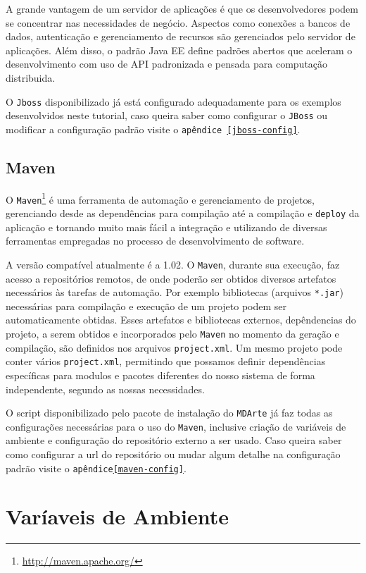 A grande vantagem de um servidor de aplicações é que os desenvolvedores podem se
concentrar nas necessidades de negócio. Aspectos como conexões a bancos de
dados, autenticação e gerenciamento de recursos são gerenciados pelo servidor de
aplicações. Além disso, o padrão Java EE define padrões abertos que aceleram o
desenvolvimento com uso de API padronizada e pensada para computação
distribuida.

O \texttt{Jboss} disponibilizado já está configurado adequadamente para os
exemplos desenvolvidos neste tutorial, caso queira saber como configurar o
\texttt{JBoss} ou modificar a configuração padrão visite o \texttt{apêndice
\ref{jboss-config}}.

\subsection{Maven}
O
\texttt{Maven}\footnote{\href{http://maven.apache.org/}{http://maven.apache.org/}}
é uma ferramenta de automação e gerenciamento de projetos, gerenciando desde as
dependências para compilação até a compilação e \texttt{deploy} da aplicação e
tornando muito mais fácil a integração e utilizando de diversas ferramentas
empregadas no processo de desenvolvimento de software.

A versão compatível atualmente é a 1.02. O \texttt{Maven}, durante sua execução,
faz acesso a repositórios remotos, de onde poderão ser obtidos diversos artefatos
necessários às tarefas de automação. Por exemplo bibliotecas (arquivos
\texttt{*.jar}) necessárias para compilação e execução de um projeto podem ser
automaticamente obtidas. Esses artefatos e bibliotecas externos, depêndencias do
projeto, a serem obtidos e incorporados pelo \texttt{Maven} no momento da
geração e compilação, são definidos nos arquivos \texttt{project.xml}. Um mesmo
projeto pode conter vários \texttt{project.xml}, permitindo que possamos definir
dependências específicas para modulos e pacotes diferentes do nosso sistema de
forma independente, segundo as nossas necessidades.

O script disponibilizado pelo pacote de instalação do \texttt{MDArte} já faz
todas as configurações necessárias para o uso do \texttt{Maven}, inclusive criação de variáveis de
ambiente e configuração do repositório externo a ser usado. Caso queira saber
como configurar a url do repositório ou mudar algum detalhe na configuração
padrão visite o \texttt{apêndice\ref{maven-config}}.

\section{Varíaveis de Ambiente}

